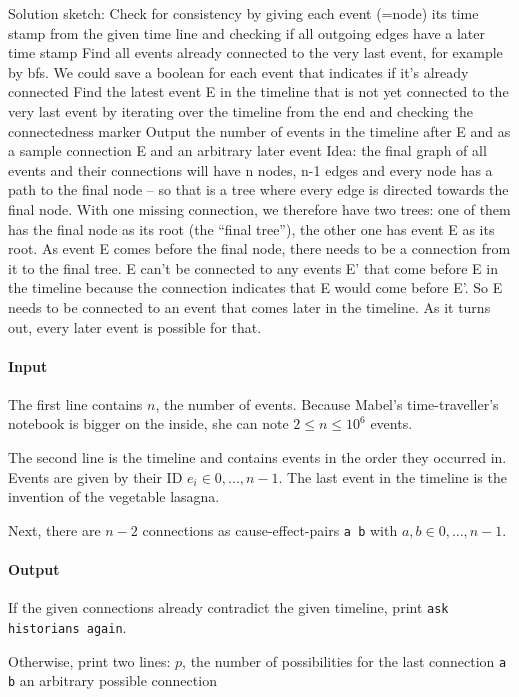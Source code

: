 Solution sketch:
Check for consistency by giving each event (=node) its time stamp from the given time line and checking if all outgoing edges have a later time stamp
Find all events already connected to the very last event, for example by bfs. We could save a boolean for each event that indicates if it’s already connected
Find the latest event E in the timeline that is not yet connected to the very last event by iterating over the timeline from the end and checking the connectedness marker
Output the number of events in the timeline after E and as a sample connection E and an arbitrary later event
Idea: the final graph of all events and their connections will have n nodes, n-1 edges and every node has a path to the final node – so that is a tree where every edge is directed towards the final node. With one missing connection, we therefore have two trees: one of them has the final node as its root (the “final tree”), the other one has event E as its root. As event E comes before the final node, there needs to be a connection from it to the final tree. E can’t be connected to any events E’ that come before E in the timeline because the connection indicates that E would come before E’. So E needs to be connected to an event that comes later in the timeline. As it turns out, every later event is possible for that.

\paragraph*{Input}

The first line contains $n$, the number of events.
Because Mabel's time-traveller’s notebook is bigger on the inside, she can note $2 \leq n \leq 10^6$ events.

The second line is the timeline and contains events in the order they occurred in.
Events are given by their ID $e_i \in {0,...,n-1}$.
The last event in the timeline is the invention of the vegetable lasagna.

Next, there are $n-2$ connections as cause-effect-pairs \texttt{a b} with $a,b \in {0, \ldots ,n-1}$.

\paragraph*{Output}

If the given connections already contradict the given timeline, print \texttt{ask historians again}.

Otherwise, print two lines:
$p$, the number of possibilities for the last connection
\texttt{a b} an arbitrary possible connection

\begin{samples}
\end{samples}

